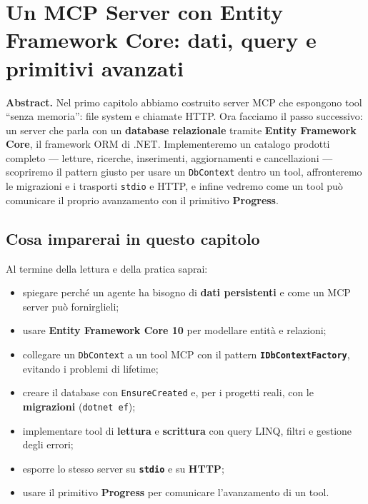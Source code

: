 \documentclass[
  italian,
  10pt,
]{book}
\providecommand{\tightlist}{%
  \setlength{\itemsep}{0pt}\setlength{\parskip}{0pt}}
\begin{document}
\section{Un MCP Server con Entity Framework Core: dati, query e
primitivi
avanzati}\label{un-mcp-server-con-entity-framework-core-dati-query-e-primitivi-avanzati}

\textbf{Abstract.} Nel primo capitolo abbiamo costruito server MCP che
espongono tool ``senza memoria'': file system e chiamate HTTP. Ora
facciamo il passo successivo: un server che parla con un
\textbf{database relazionale} tramite \textbf{Entity Framework Core}, il
framework ORM di .NET. Implementeremo un catalogo prodotti completo ---
letture, ricerche, inserimenti, aggiornamenti e cancellazioni ---
scopriremo il pattern giusto per usare un \texttt{DbContext} dentro un
tool, affronteremo le migrazioni e i trasporti \texttt{stdio} e HTTP, e
infine vedremo come un tool può comunicare il proprio avanzamento con il
primitivo \textbf{Progress}.

\subsection{Cosa imparerai in questo
capitolo}\label{cosa-imparerai-in-questo-capitolo-1}

Al termine della lettura e della pratica saprai:

\begin{itemize}
\tightlist
\item
  spiegare perché un agente ha bisogno di \textbf{dati persistenti} e
  come un MCP server può fornirglieli;
\item
  usare \textbf{Entity Framework Core 10} per modellare entità e
  relazioni;
\item
  collegare un \texttt{DbContext} a un tool MCP con il pattern
  \textbf{\texttt{IDbContextFactory}}, evitando i problemi di lifetime;
\item
  creare il database con \texttt{EnsureCreated} e, per i progetti reali,
  con le \textbf{migrazioni} (\texttt{dotnet\ ef});
\item
  implementare tool di \textbf{lettura} e \textbf{scrittura} con query
  LINQ, filtri e gestione degli errori;
\item
  esporre lo stesso server su \textbf{\texttt{stdio}} e su
  \textbf{HTTP};
\item
  usare il primitivo \textbf{Progress} per comunicare l'avanzamento di
  un tool.
\end{itemize}
\end{document}
